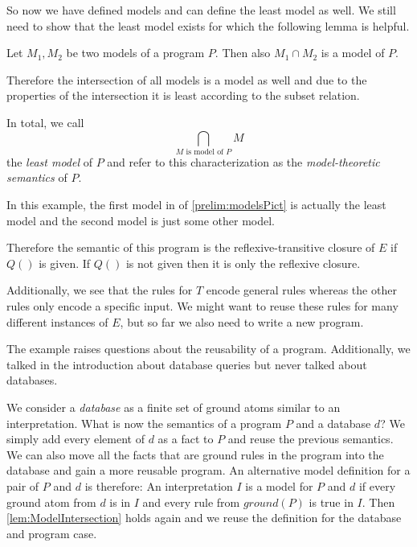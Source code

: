 So now we have defined models and can define the least model as well. We still need to show that the least model exists for which the following lemma is helpful.

\begin{lemma}\label{lem:ModelIntersection}
Let $M_1, M_2$ be two models of a program $P$. Then also $M_1 \cap M_2$ is a model of $P$.
\end{lemma}

Therefore the intersection of all models is a model as well and due to the properties of the intersection it is least according to the subset relation. 

In total, we call \[\bigcap_{\text{$M$ is model of $P$}} M\] the \textit{least model} of $P$ and refer to this characterization as the \textit{model-theoretic semantics} of $P$.

\begin{example}
    In this example, the first model in of \cref{prelim:modelsPict} is actually the least model and the second model is just some other model.

    Therefore the semantic of this program is the reflexive-transitive closure of $E$ if $Q()$ is given.
    If $Q()$ is not given then it is only the reflexive closure.

    Additionally, we see that the rules for $T$ encode general rules whereas the other rules only encode a specific input. We might want to reuse these rules for many different instances of $E$, but so far we also need to write a new program.
\end{example}

The example raises questions about the reusability of a program. Additionally, we talked in the introduction about database queries but never talked about databases. 

We consider a \textit{database} as a finite set of ground atoms similar to an interpretation. What is now the semantics of a program $P$ and a database $d$? We simply add every element of $d$ as a fact to $P$ and reuse the previous semantics. We can also move all the facts that are ground rules in the program into the database and gain a more reusable program.
An alternative model definition for a pair of $P$ and $d$ is therefore: An interpretation $I$ is a model for $P$ and $d$ if every ground atom from $d$ is in $I$ and every rule from $ground(P)$ is true in $I$. Then \cref{lem:ModelIntersection} holds again and we reuse the definition for the database and program case.

